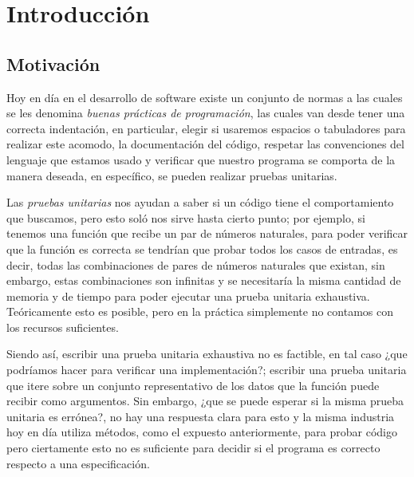 \chapter{Introducción}

\section{Motivación}
\label{motivation}
Hoy en día en el desarrollo de software existe un conjunto de normas a las cuales se les denomina
\textit{buenas pr\'acticas de programaci\'on}, las cuales van desde tener una correcta
indentaci\'on, en particular, elegir si usaremos espacios o tabuladores para realizar este acomodo, 
la documentaci\'on del c\'odigo, respetar las convenciones del lenguaje que estamos usado y 
verificar que nuestro programa se comporta de la manera deseada, en espec\'ifico, se pueden 
realizar pruebas unitarias.

Las \textit{pruebas unitarias} nos ayudan a saber si un código tiene el comportamiento
que buscamos, pero esto sol\'o nos sirve hasta cierto punto; por ejemplo, si tenemos una funci\'on
que recibe un par de números naturales, para poder verificar que la funci\'on es correcta se 
tendrían que probar todos los casos de entradas, es decir, todas las combinaciones de pares de 
números naturales que existan, sin embargo, estas combinaciones son infinitas y se necesitaría la 
misma cantidad de memoria y de tiempo para poder ejecutar una prueba unitaria exhaustiva. 
Teóricamente esto es posible, pero en la pr\'actica simplemente no contamos con los recursos 
suficientes.

Siendo as\'i, escribir una prueba unitaria exhaustiva no es factible, en tal caso ¿que podríamos
hacer para verificar una implementaci\'on?; escribir una prueba unitaria que itere sobre un conjunto
representativo de los datos que la funci\'on puede recibir como argumentos. Sin embargo, ¿que se 
puede esperar si la misma prueba unitaria es errónea?, no hay una respuesta clara para esto y la 
misma industria hoy en día utiliza métodos, como el expuesto anteriormente, para probar c\'odigo 
pero ciertamente esto no es suficiente para decidir si el programa es correcto respecto a una 
especificaci\'on.

